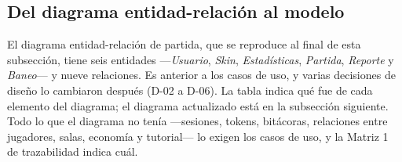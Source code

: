 \subsection*{Del diagrama entidad-relación al modelo}

El diagrama entidad-relación de partida, que se reproduce al final de esta subsección, tiene seis entidades —\textit{Usuario}, \textit{Skin}, \textit{Estadísticas}, \textit{Partida}, \textit{Reporte} y \textit{Baneo}— y nueve relaciones. Es anterior a los casos de uso, y varias decisiones de diseño lo cambiaron después (\mbox{D-02} a \mbox{D-06}). La tabla indica qué fue de cada elemento del diagrama; el diagrama actualizado está en la subsección siguiente. Todo lo que el diagrama no tenía —sesiones, tokens, bitácoras, relaciones entre jugadores, salas, economía y tutorial— lo exigen los casos de uso, y la Matriz 1 de trazabilidad indica cuál.

